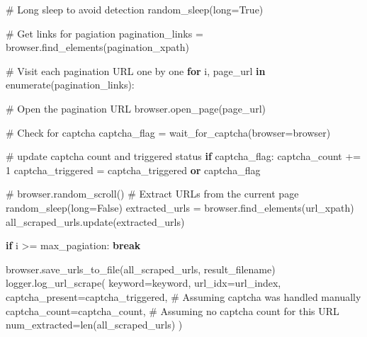 \documentclass[
  titlepage]{article}
\newenvironment{Shaded}{\begin{snugshade}}{\end{snugshade}}
\newcommand{\BuiltInTok}[1]{\textcolor[rgb]{0.00,0.23,0.31}{#1}}
\newcommand{\CommentTok}[1]{\textcolor[rgb]{0.37,0.37,0.37}{#1}}
\newcommand{\ControlFlowTok}[1]{\textcolor[rgb]{0.00,0.23,0.31}{\textbf{#1}}}
\newcommand{\DecValTok}[1]{\textcolor[rgb]{0.68,0.00,0.00}{#1}}
\newcommand{\KeywordTok}[1]{\textcolor[rgb]{0.00,0.23,0.31}{\textbf{#1}}}
\newcommand{\NormalTok}[1]{\textcolor[rgb]{0.00,0.23,0.31}{#1}}
\newcommand{\OperatorTok}[1]{\textcolor[rgb]{0.37,0.37,0.37}{#1}}
\newcommand{\VariableTok}[1]{\textcolor[rgb]{0.07,0.07,0.07}{#1}}
\begin{document}
\begin{Shaded}
\begin{Highlighting}[]
    \CommentTok{\# Long sleep to avoid detection}
\NormalTok{    random\_sleep(}\BuiltInTok{long}\OperatorTok{=}\VariableTok{True}\NormalTok{)}

    \CommentTok{\# Get links for pagiation}
\NormalTok{    pagination\_links }\OperatorTok{=}\NormalTok{ browser.find\_elements(pagination\_xpath)}

    \CommentTok{\# Visit each pagination URL one by one}
    \ControlFlowTok{for}\NormalTok{ i, page\_url }\KeywordTok{in} \BuiltInTok{enumerate}\NormalTok{(pagination\_links):}
    
        \CommentTok{\# Open the pagination URL}
\NormalTok{        browser.open\_page(page\_url)}
        
        \CommentTok{\# Check for captcha}
\NormalTok{        captcha\_flag }\OperatorTok{=}\NormalTok{ wait\_for\_captcha(browser}\OperatorTok{=}\NormalTok{browser)}

        \CommentTok{\# update captcha count and triggered status}
        \ControlFlowTok{if}\NormalTok{ captcha\_flag:}
\NormalTok{            captcha\_count }\OperatorTok{+=} \DecValTok{1}
\NormalTok{            captcha\_triggered }\OperatorTok{=}\NormalTok{ captcha\_triggered }\KeywordTok{or}\NormalTok{ captcha\_flag}

        \CommentTok{\# browser.random\_scroll()}
        \CommentTok{\# Extract URLs from the current page}
\NormalTok{        random\_sleep(}\BuiltInTok{long}\OperatorTok{=}\VariableTok{False}\NormalTok{)}
\NormalTok{        extracted\_urls }\OperatorTok{=}\NormalTok{ browser.find\_elements(url\_xpath)}
\NormalTok{        all\_scraped\_urls.update(extracted\_urls)}

        \ControlFlowTok{if}\NormalTok{ i }\OperatorTok{\textgreater{}=}\NormalTok{ max\_pagiation:}
            \ControlFlowTok{break}

\NormalTok{    browser.save\_urls\_to\_file(all\_scraped\_urls, result\_filename)}
\NormalTok{    logger.log\_url\_scrape(}
\NormalTok{        keyword}\OperatorTok{=}\NormalTok{keyword, }
\NormalTok{        url\_idx}\OperatorTok{=}\NormalTok{url\_index, }
\NormalTok{        captcha\_present}\OperatorTok{=}\NormalTok{captcha\_triggered,  }\CommentTok{\# Assuming captcha was handled manually}
\NormalTok{        captcha\_count}\OperatorTok{=}\NormalTok{captcha\_count,  }\CommentTok{\# Assuming no captcha count for this URL}
\NormalTok{        num\_extracted}\OperatorTok{=}\BuiltInTok{len}\NormalTok{(all\_scraped\_urls)}
\NormalTok{    )}
\end{Highlighting}
\end{Shaded}
\end{document}
